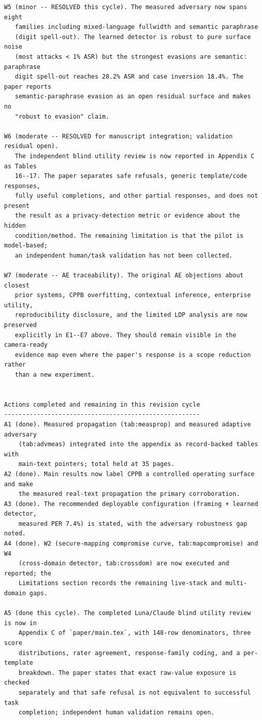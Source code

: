 \documentclass[10pt]{article}
\begin{document}
\begin{verbatim}
W5 (minor -- RESOLVED this cycle). The measured adversary now spans eight
   families including mixed-language fullwidth and semantic paraphrase
   (digit spell-out). The learned detector is robust to pure surface noise
   (most attacks < 1% ASR) but the strongest evasions are semantic: paraphrase
   digit spell-out reaches 28.2% ASR and case inversion 18.4%. The paper reports
   semantic-paraphrase evasion as an open residual surface and makes no
   "robust to evasion" claim.

W6 (moderate -- RESOLVED for manuscript integration; validation residual open).
   The independent blind utility review is now reported in Appendix C as Tables
   16--17. The paper separates safe refusals, generic template/code responses,
   fully useful completions, and other partial responses, and does not present
   the result as a privacy-detection metric or evidence about the hidden
   condition/method. The remaining limitation is that the pilot is model-based;
   an independent human/task validation has not been collected.

W7 (moderate -- AE traceability). The original AE objections about closest
   prior systems, CPPB overfitting, contextual inference, enterprise utility,
   reproducibility disclosure, and the limited LDP analysis are now preserved
   explicitly in E1--E7 above. They should remain visible in the camera-ready
   evidence map even where the paper's response is a scope reduction rather
   than a new experiment.


Actions completed and remaining in this revision cycle
------------------------------------------------------
A1 (done). Measured propagation (tab:measprop) and measured adaptive adversary
    (tab:advmeas) integrated into the appendix as record-backed tables with
    main-text pointers; total held at 35 pages.
A2 (done). Main results now label CPPB a controlled operating surface and make
    the measured real-text propagation the primary corroboration.
A3 (done). The recommended deployable configuration (framing + learned detector,
    measured PER 7.4%) is stated, with the adversary robustness gap noted.
A4 (done). W2 (secure-mapping compromise curve, tab:mapcompromise) and W4
    (cross-domain detector, tab:crossdom) are now executed and reported; the
    Limitations section records the remaining live-stack and multi-domain gaps.

A5 (done this cycle). The completed Luna/Claude blind utility review is now in
    Appendix C of `paper/main.tex`, with 148-row denominators, three score
    distributions, rater agreement, response-family coding, and a per-template
    breakdown. The paper states that exact raw-value exposure is checked
    separately and that safe refusal is not equivalent to successful task
    completion; independent human validation remains open.


\end{verbatim}
\end{document}
